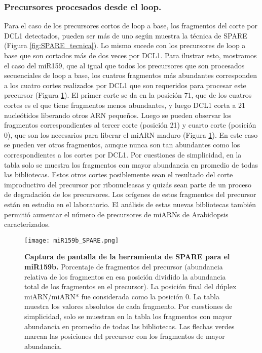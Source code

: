 \subsubsection{Precursores procesados desde el loop.}

Para el caso de los precursores cortos de loop a base, los fragmentos del corte por DCL1 detectados, pueden ser más de uno según muestra la técnica de SPARE (Figura \ref{fig:SPARE_tecnica}).
Lo mismo sucede con los precursores de loop a base que son cortados más de dos veces por DCL1.
Para ilustrar esto, mostramos  el caso del miR159, que al igual que todos los precursores que son procesados secuenciales de loop a base, los cuatros fragmentos más abundantes corresponden a los cuatro cortes realizados por DCL1 que son requeridos para procesar este precursor (Figura \ref{fig:miR159b_SPARE}).
El primer corte se da en la posición 71, que de los cuatros cortes es el que tiene fragmentos menos abundantes, y luego DCL1 corta a 21 nucleótidos liberando otros ARN pequeños.
Luego se pueden observar los fragmentos correspondientes al tercer corte (posición 21) y cuarto corte (posición 0), que son los necesarios para liberar el miARN maduro (Figura \ref{fig:miR159b_SPARE}).
En este caso se pueden ver otros fragmentos, aunque nunca son tan abundantes como los correspondientes a los cortes por DCL1.
Por cuestiones de simplicidad, en la tabla solo se muestra los fragmentos con mayor abundancia en promedio de todas las bibliotecas.
Estos otros cortes posiblemente sean el resultado del corte improductivo del precursor por ribonucleasas y quizás sean parte de un proceso de degradación de los precursores.
Los orígenes de estos fragmentos del precursor están en estudio en el laboratorio.
El análisis de estas nuevas bibliotecas también permitió aumentar el número de precursores de miARNs de Arabidopsis caracterizados.

\begin{landscape}
    \begin{figure}[htbp!] 
        \centering    
        \texttt{[image: miR159b\_SPARE.png]}
		\caption[Captura de pantalla de la herramienta de SPARE para el miR159b]{
        \textbf{Captura de pantalla de la herramienta de SPARE para el miR159b.}
        Porcentaje de fragmentos del precursor (abundancia relativa de los fragmentos en esa posición dividido la abundancia total de los fragmentos en el precursor).
        La posición final del dúplex miARN/miARN* fue considerada como la posición 0.
        La tabla muestra los valores absolutos de cada fragmento.
        Por cuestiones de simplicidad, solo se muestran en la tabla los fragmentos con mayor abundancia en promedio de todas las bibliotecas.
        Las flechas verdes marcan las posiciones del precursor con los fragmentos de mayor abundancia.
        }
		\label{fig:miR159b_SPARE}
    \end{figure}
\end{landscape}


